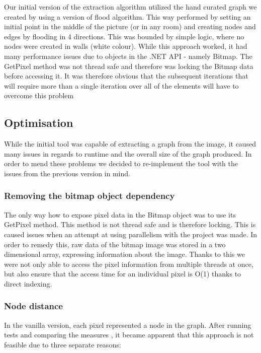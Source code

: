 \documentclass[main.tex]{subfiles}
\begin{document}
Our initial version of the extraction algorithm utilized the hand curated graph we created by using a version of flood algorithm. This way performed by setting an initial point in the middle of the picture (or in any room)  and creating nodes and edges by flooding in 4 directions. This was bounded by simple logic, where no nodes were created in walls (white colour). While this approach worked, it had many performance issues due to objects in the .NET API - namely Bitmap. The GetPixel method was not thread safe and therefore was locking the Bitmap data before accessing it. It was therefore obvious that the subsequent iterations that will require more than a single iteration over all of the elements will have to overcome this problem

\subsection*{Optimisation}
While the initial tool was capable of extracting a graph from the image, it caused many issues in regards to runtime and the overall size of the graph produced. In order to mend these problems we decided to re-implement the tool with the issues from the previous version in mind. 

\subsubsection*{Removing the bitmap object dependency}

The only way how to expose pixel data in the Bitmap object was to use its GetPixel method. This method is not thread safe and is therefore locking. This is caused issues when an attempt at using parallelism with the project was made. In order to remedy this, raw data of the bitmap image was stored in a two dimensional array, expressing information about the image. Thanks to this we were not only able to access the pixel information from multiple threads at once, but also ensure that the access time for an individual pixel is O(1) thanks to direct indexing. 

\subsubsection*{Node distance}
In the vanilla version, each pixel represented a node in the graph. After running tests and comparing the measures , it became apparent that this approach is not feasible due to three separate reasons:
	
\end{document}
